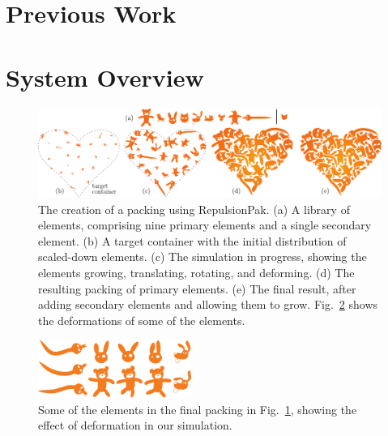\section{Previous Work}
\label{repulsionpak_previous_work}


\section{System Overview}
\label{repulsionpak_system_overview}




\begin{figure}[h]
\centering
\includegraphics[width=1.0\textwidth]{figures/repulsionpak/pipeline.pdf} 
\caption[RepulsionPak pipeline]
{\label{fig_repulsionpak_pipeline} 
The creation of a packing using RepulsionPak.
  (a) A library of elements, comprising nine primary elements and a single
  	secondary element.
  (b) A target container with the initial distribution of scaled-down elements.
  (c) The simulation in progress, showing the elements growing, translating,
  	rotating, and deforming.
  (d) The resulting packing of primary elements.
  (e) The final result, after adding secondary elements and allowing them to
  	grow.
  	Fig.~\ref{fig_defviz} shows the deformations of some of the elements. }
\end{figure}

\begin{figure}[h]
\centering
\includegraphics[width=5cm]{figures/repulsionpak/pipeline_defviz_csk.pdf}
\caption[Element deformation]{
	\label{fig_defviz}
	Some of the elements in the final packing in Fig.~\ref{fig_repulsionpak_pipeline}, 
	showing the effect of deformation in our simulation.
}
\end{figure}

